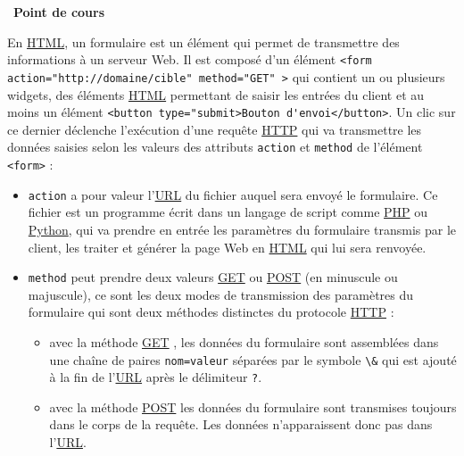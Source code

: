 \documentclass[
  11pt,
]{article}
\newcommand{\passthrough}[1]{#1}
\providecommand{\tightlist}{%
  \setlength{\itemsep}{0pt}\setlength{\parskip}{0pt}}
\newcounter{cours}
\newenvironment{cours}[1]
{\par \medskip   \addtocounter{cours}{1} \noindent  
\begin{bclogo}[arrondi =0.1,  ombre = true, barre=none, logo=\bcbook, marge=4]{~\textbf{Point de cours} \textbf{\thecours} {\itshape #1} }  \par}
{
\end{bclogo}
 \par \bigskip }
\newcounter{prog}
\begin{document}
\begin{cours}{}

En \href{https://developer.mozilla.org/fr/docs/Glossaire/HTML}{HTML}, un
formulaire est un élément qui permet de transmettre des informations à
un serveur Web. Il est composé d'un élément
\passthrough{\lstinline!<form action="http://domaine/cible" method="GET" >!}
qui contient un ou plusieurs widgets, des éléments
\href{https://developer.mozilla.org/fr/docs/Glossaire/HTML}{HTML}
permettant de saisir les entrées du client et au moins un élément
\passthrough{\lstinline!<button type="submit>Bouton d'envoi</button>!}.
Un clic sur ce dernier déclenche l'exécution d'une requête
\href{https://developer.mozilla.org/fr/docs/Glossaire/HTTP}{HTTP} qui va
transmettre les données saisies selon les valeurs des attributs
\passthrough{\lstinline!action!} et \passthrough{\lstinline!method!} de
l'élément \passthrough{\lstinline!<form>!} :

\begin{itemize}
\tightlist
\item
  \passthrough{\lstinline!action!} a pour valeur
  l'\href{https://developer.mozilla.org/fr/docs/Glossaire/URL}{URL} du
  fichier auquel sera envoyé le formulaire. Ce fichier est un programme
  écrit dans un langage de script comme
  \href{https://developer.mozilla.org/fr/docs/Glossaire/PHP}{PHP} ou
  \href{https://docs.python.org/3.7/library/cgi.html}{Python}, qui va
  prendre en entrée les paramètres du formulaire transmis par le client,
  les traiter et générer la page Web en
  \href{https://developer.mozilla.org/fr/docs/Glossaire/HTML}{HTML} qui
  lui sera renvoyée.
\item
  \passthrough{\lstinline!method!} peut prendre deux valeurs
  \href{https://developer.mozilla.org/fr/docs/Web/HTTP/M\%C3\%A9thode/GET}{GET}
  ou
  \href{https://developer.mozilla.org/fr/docs/Web/HTTP/M\%C3\%A9thode/POST}{POST}
  (en minuscule ou majuscule), ce sont les deux modes de transmission
  des paramètres du formulaire qui sont deux méthodes distinctes du
  protocole
  \href{https://developer.mozilla.org/fr/docs/Glossaire/HTTP}{HTTP} :

  \begin{itemize}
  \tightlist
  \item
    avec la méthode
    \href{https://developer.mozilla.org/fr/docs/Web/HTTP/M\%C3\%A9thode/GET}{GET}
    , les données du formulaire sont assemblées dans une chaîne de
    paires \passthrough{\lstinline!nom=valeur!} séparées par le symbole
    \passthrough{\lstinline!\&!} qui est ajouté à la fin de
    l'\href{https://developer.mozilla.org/fr/docs/Glossaire/URL}{URL}
    après le délimiteur \passthrough{\lstinline!?!}.
  \item
    avec la méthode
    \href{https://developer.mozilla.org/fr/docs/Web/HTTP/M\%C3\%A9thode/POST}{POST}
    les données du formulaire sont transmises toujours dans le corps de
    la requête. Les données n'apparaissent donc pas dans
    l'\href{https://developer.mozilla.org/fr/docs/Glossaire/URL}{URL}.
  \end{itemize}
\end{itemize}


\end{cours}
\end{document}
